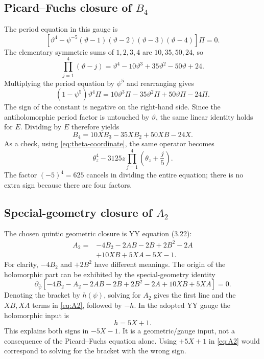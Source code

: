 \documentclass[11pt,a4paper]{article}
\numberwithin{equation}{section}
\newcommand{\bdel}{\bar\partial_{\bar\psi}}
\newcommand{\tht}{\vartheta}
\begin{document}
\subsection{Picard--Fuchs closure of \texorpdfstring{$B_4$}{B4}}
The period equation in this gauge is
\begin{equation}
\left[\tht^4-\psi^{-5}
   (\tht-1)(\tht-2)(\tht-3)(\tht-4)\right]\Pi=0.
\end{equation}
The elementary symmetric sums of $1,2,3,4$ are $10,35,50,24$, so
\begin{equation}
\prod_{j=1}^4(\tht-j)
 =\tht^4-10\tht^3+35\tht^2-50\tht+24.
\end{equation}
Multiplying the period equation by $\psi^5$ and rearranging gives
\begin{equation}
(1-\psi^5)\tht^4\Pi
  =10\tht^3\Pi-35\tht^2\Pi+50\tht\Pi-24\Pi.
\end{equation}
The sign of the constant is negative on the right-hand side. Since the
antiholomorphic period factor is untouched by $\tht$, the same linear
identity holds for $E$. Dividing by $E$ therefore yields
\begin{equation}\boxed{
B_4=10XB_3-35XB_2+50XB-24X.}\label{eq:B4}
\end{equation}
As a check, using \eqref{eq:theta-coordinate}, the same operator becomes
\begin{equation}
\theta_z^4-3125z\prod_{j=1}^4\left(\theta_z+\frac j5\right).
\end{equation}
The factor $(-5)^4=625$ cancels in dividing the entire equation; there
is no extra sign because there are four factors.

\subsection{Special-geometry closure of \texorpdfstring{$A_2$}{A2}}
The chosen quintic geometric closure is YY equation (3.22):
\begin{equation}\boxed{\begin{aligned}
A_2={}&-4B_2-2AB-2B+2B^2-2A\\
      &+10XB+5XA-5X-1.
\end{aligned}}\label{eq:A2}
\end{equation}
For clarity, $-4B_2$ and $+2B^2$ have different meanings.
The origin of the holomorphic part can be exhibited by the
special-geometry identity
\begin{equation}
\bdel\left[-4B_2-A_2-2AB-2B+2B^2-2A+10XB+5XA\right]=0.
\end{equation}
Denoting the bracket by $h(\psi)$, solving for $A_2$ gives the first
line and the $XB,XA$ terms in \eqref{eq:A2}, followed by $-h$.
In the adopted YY gauge the holomorphic input is
\begin{equation}
h=5X+1.
\end{equation}
This explains both signs in $-5X-1$. It is a geometric/gauge input,
not a consequence of the Picard--Fuchs equation alone. Using $+5X+1$
in \eqref{eq:A2} would correspond to solving for the bracket with the wrong sign.
\end{document}
